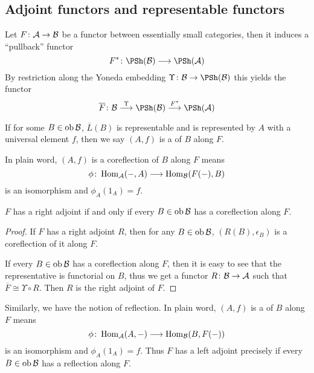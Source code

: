 \subsection{Adjoint functors and representable functors}
  Let $F\colon{\cal A}\to{\cal B}$ be a functor between essentially small categories, then it induces a ``pullback'' functor
  \begin{equation*}
    F^{\ast}\colon\PSh(\Bb)\To\PSh(\Aa)
  \end{equation*}
  By restriction along the Yoneda embedding $\Upsilon\colon\Bb\to\PSh(\Bb)$ this yields the functor
  \begin{equation*}
    \overline{F}\colon\Bb\markar{\Upsilon}\PSh(\Bb)\markar{F^{\ast}}\PSh(\Aa)
  \end{equation*}
  \begin{defn}
    If for some $B\in\operatorname{ob}{\cal B}$, $\overline{L}(B)$ is representable and is represented by $A$ with a universal element $f$, then we say $(A,f)$ is a  of $B$ along $F$.
  \end{defn}
  In plain word, $(A,f)$ is a coreflection of $B$ along $F$ means
  \begin{equation*}
    \phi\colon\operatorname{Hom}_{{\cal A}}(-,A)\longrightarrow\operatorname{Hom}_{{\cal B}}(F(-),B)
  \end{equation*}
  is an isomorphism and $\phi_A(1_A)=f$.
  \begin{prop}
    $F$ has a right adjoint if and only if every $B\in\operatorname{ob}{\cal B}$ has a coreflection along $F$.
  \end{prop}
  \begin{proof}
    If $F$ has a right adjoint $R$, then for any $B\in\operatorname{ob}{\cal B}$, $(R(B),\epsilon_B)$ is a coreflection of it along $F$.

    If every $B\in\operatorname{ob}{\cal B}$ has a coreflection along $F$, then it is easy to see that the representative is functorial on $B$, thus we get a functor $R\colon{\cal B}\to{\cal A}$ such that $\overline{F}\cong\Upsilon\circ R$. Then $R$ is the right adjoint of $F$.
  \end{proof}

  Similarly, we have the notion of reflection. In plain word, $(A,f)$ is a  of $B$ along $F$ means
  \begin{equation*}
    \phi\colon\operatorname{Hom}_{{\cal A}}(A,-)\longrightarrow\operatorname{Hom}_{{\cal B}}(B,F(-))
  \end{equation*}
  is an isomorphism and $\phi_A(1_A)=f$. Thus $F$ has a left adjoint precisely if every $B\in\operatorname{ob}{\cal B}$ has a reflection along $F$.

